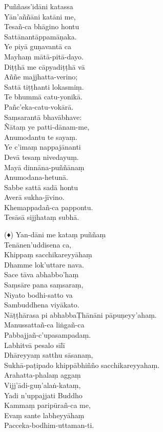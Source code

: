 Puññass’idāni katassa\\
Yān’aññāni katāni me,\\
Tesañ-ca bhāgino hontu\\
Sattānantāppamāṇaka.\\
Ye piyā guṇavantā ca\\
Mayhaṃ mātā-pitā-dayo.\\
Diṭṭhā me cāpyadiṭṭhā vā\\
Aññe majjhatta-verino;\\
Sattā tiṭṭhanti lokasmiṃ.\\
Te bhummā catu-yonikā.\\
Pañc’eka-catu-vokārā.\\
Saṃsarantā bhavābhave:\\
Ñātaṃ ye patti-dānam-me,\\
Anumodantu te sayaṃ.\\
Ye c’imaṃ nappajānanti\\
Devā tesaṃ nivedayuṃ.\\
Mayā dinnāna-puññānaṃ\\
Anumodana-hetunā.\\
Sabbe sattā sadā hontu\\
Averā sukha-jīvino.\\
Khemappadañ-ca pappontu.\\
Tesāsā sijjhataṃ subhā.

(♦) Yan-dāni me kataṃ puññaṃ\\
Tenānen’uddisena ca,\\
Khippaṃ sacchikareyyāhaṃ\\
Dhamme lok’uttare nava.\\
Sace tāva abhabbo’haṃ\\
Saṃsāre pana saṃsaraṃ,\\
Niyato bodhi-satto va\\
Sambuddhena viyākato.\\
Nāṭṭhārasa pi abhabbaṬhānāni pāpuṇeyy’ahaṃ.\\
Manussattañ-ca liṅgañ-ca\\
Pabbajjañ-c’upasampadaṃ.\\
Labhitvā pesalo sīlī\\
Dhāreyyaṃ satthu sāsanaṃ,\\
Sukhā-paṭipado khippābhiñño sacchikareyyahaṃ.\\
Arahatta-phalaṃ aggaṃ\\
Vijj’ādi-guṇ’alaṅ-kataṃ,\\
Yadi n’uppajjati Buddho\\
Kammaṃ paripūrañ-ca me,\\
Evaṃ sante labheyyāhaṃ\\
Pacceka-bodhim-uttaman-ti.

